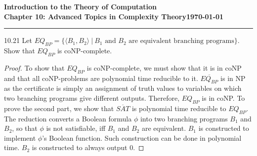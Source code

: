 \documentclass[11pt]{article}
\newcommand{\dated}{\today}
\begin{document}
\textbf{Introduction to the Theory of
Computation}\hfill\textbf{\myname}\\[0.01in]
\textbf{Chapter 10: Advanced Topics in Complexity Theory}\hfill\textbf{\dated}\\
\smallskip\hrule\bigskip

\begin{problem}{10.21}
Let $EQ_{BP} = \{\langle B_1, B_2 \rangle \ | \ B_1 \text{ and } B_2 \text{ are equivalent branching programs} \}$. Show that $EQ_{BP}$ is coNP-complete.
\end{problem}

\begin{proof}
To show that $EQ_{BP}$ is coNP-complete, we must show that it is in coNP and that all coNP-problems are polynomial time reducible to it. $\overline{EQ_{BP}}$ is in NP as the certificate is simply an assignment of truth values to variables on which two branching programs give different outputs. Therefore, $EQ_{BP}$ is in coNP. To prove the second part, we show that $\overline{SAT}$ is polynomial time reducible to $EQ_{BP}$. The reduction converts a Boolean formula $\phi$ into two branching programs $B_1$ and $B_2$, so that $\phi$ is not satisfiable, iff $B_1$ and $B_2$ are equivalent. $B_1$ is constructed to implement $\phi$'s Boolean function. Such construction can be done in polynomial time. $B_2$ is constructed to always output 0.
\end{proof}
\end{document}
